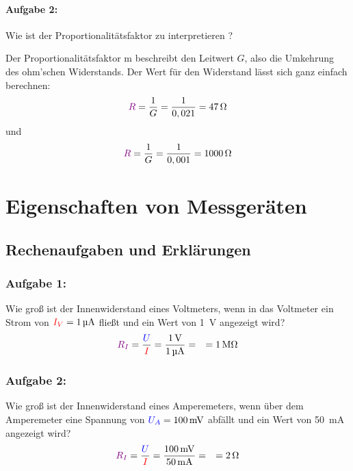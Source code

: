 \documentclass[a4paper,titlepage,parskip]{scrreprt}
\newcommand{\spannung}[1]{\textcolor{blue}{#1}}
\newcommand{\strom}[1]{\textcolor{red}{#1}}
\newcommand{\widerstand}[1]{\textcolor{violet}{#1}}
\begin{document}
          \subsubsection{Aufgabe 2:} Wie ist der Proportionalitätsfaktor zu interpretieren ? 
          
          Der Proportionalitätsfaktor m beschreibt den Leitwert $G$, also die Umkehrung des ohm'schen Widerstands. Der Wert für den Widerstand lässt sich ganz einfach berechnen: 
          \begin{equation*}
          		\widerstand{R} = \frac{1}{G} = \frac{1}{0,021} = \SI{47}{\ohm}
          \end{equation*}
          und
		  \begin{equation*}
          		\widerstand{R} = \frac{1}{G} = \frac{1}{0,001} = \SI{1000}{\ohm}
          \end{equation*}
    \chapter{Eigenschaften von Messgeräten}


        \section{Rechenaufgaben und Erklärungen}
           
           \subsection{Aufgabe 1:} Wie groß ist der Innenwiderstand eines Voltmeters, wenn in das Voltmeter ein Strom von $\strom{I_V} = \SI{1}{\micro\ampere}$ fließt und ein Wert von \SI{1}{\volt} angezeigt wird?
           \begin{align*}
               \widerstand{R_I} &= \frac{\spannung{U}}{\strom{I}} = \frac{\SI{1}{\volt}}{\SI{1}{\micro\ampere}} = 
               &= \SI{1}{\mega\ohm}
           \end{align*}
           \subsection{Aufgabe 2:} Wie groß ist der Innenwiderstand eines Amperemeters, wenn über dem Amperemeter eine Spannung von $\spannung{U_A} = \SI{100}{\milli\volt}$ abfällt und ein Wert von \SI{50}{\milli\ampere} angezeigt wird?
           \begin{align*}
           \widerstand{R_I} &= \frac{\spannung{U}}{\strom{I}} = \frac{\SI{100}{\milli\volt}}{\SI{50}{\milli\ampere}} = 
           &= \SI{2}{\ohm}
           \end{align*}
\end{document}
